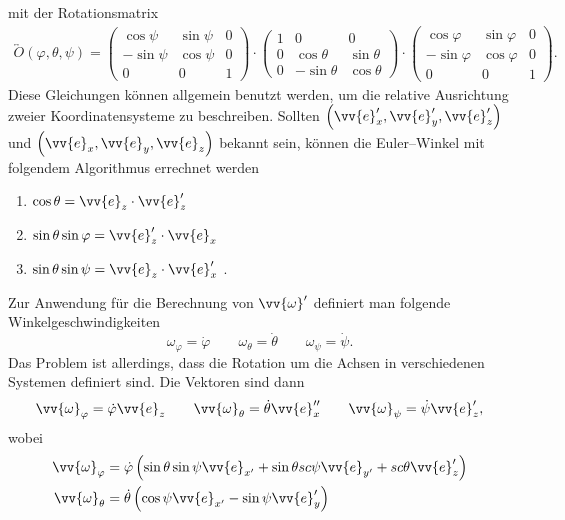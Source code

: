 \documentclass[a4paper,12pt]{article}
\numberwithin{equation}{section}
\begin{document}
mit der Rotationsmatrix
\begin{align*}
        \overleftrightarrow{O}\left(\varphi ,\theta ,\psi \right)=\begin{pmatrix}
        \cos \psi &\sin \psi &0\\
        -\sin \psi &\cos \psi &0\\
        0&0&1
        \end{pmatrix}\cdot \begin{pmatrix}
        1&0&0\\
        0&\cos \theta &\sin \theta \\
        0&-\sin \theta &\cos \theta 
        \end{pmatrix}\cdot \begin{pmatrix}
        \cos \varphi &\sin \varphi &0\\
        -\sin \varphi &\cos \varphi &0\\
        0&0&1
        \end{pmatrix}
.\end{align*}
Diese Gleichungen können allgemein benutzt werden, um die relative Ausrichtung zweier Koordinatensysteme zu beschreiben. Sollten $\left(\vv{e}_x',\vv{e}_y',\vv{e}_z'\right)$ und $\left(\vv{e}_x,\vv{e}_y,\vv{e}_z\right)$ bekannt sein, können die Euler--Winkel mit folgendem Algorithmus errechnet werden
\begin{enumerate}[label=\roman*]
        \item $\cos \theta =\vv{e}_z\cdot \vv{e}_z'$ 
        \item $\sin \theta \sin \varphi =\vv{e}_z'\cdot \vv{e}_x$ 
        \item $\sin \theta \sin \psi =\vv{e}_z\cdot \vv{e}_x'$ 
.\end{enumerate}
\indent Zur Anwendung für die Berechnung von $\vv{\omega }'$ definiert man folgende Winkelgeschwindigkeiten
\[ 
        \omega _\varphi =\dot{\varphi }\qquad \omega _\theta =\dot{\theta }\qquad \omega _\psi =\dot{\psi }
.\] 
Das Problem ist allerdings, dass die Rotation um die Achsen in verschiedenen Systemen definiert sind. Die Vektoren sind dann
\[ 
        \vv{\omega }_\varphi =\dot{\varphi }\vv{e}_z\qquad \vv{\omega }_\theta =\dot{\theta }\vv{e}_x''\qquad \vv{\omega }_\psi =\dot{\psi }\vv{e}_z'
,\] 
wobei
\begin{align*}
        \vv{\omega }_\varphi &=\dot{\varphi }\left(\sin \theta \sin \psi \vv{e}_{x'}+\sin \theta sc\psi \vv{e}_{y'}+sc\theta \vv{e}_{z}'\right)\\
        \vv{\omega }_\theta &=\dot{\theta }\left(\cos \psi \vv{e}_{x'}-\sin \psi \vv{e}_y'\right)
\end{align*}
\end{document}
